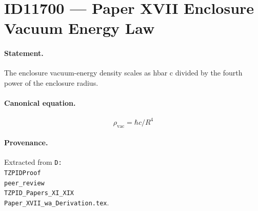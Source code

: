 \section*{ID11700 --- Paper XVII Enclosure Vacuum Energy Law}

\paragraph{Statement.}
The enclosure vacuum-energy density scales as hbar c divided by the fourth power of the enclosure radius.

\paragraph{Canonical equation.}
\[
\rho_{\mathrm{vac}}=\hbar c/R^4
\]

\paragraph{Provenance.}
Extracted from \texttt{D:\\TZPIDProof\\peer\_review\\TZPID\_Papers\_XI\_XIX\\Paper\_XVII\_wa\_Derivation.tex}.
